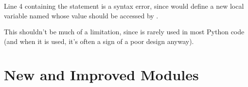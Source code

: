 \documentclass{howto}
\begin{document}
Line 4 containing the  statement is a syntax error,
since  would define a new local variable named 
whose value should be accessed by .  

This shouldn't be much of a limitation, since  is rarely
used in most Python code (and when it is used, it's often a sign of a
poor design anyway).

\begin{seealso}


\end{seealso}


\section{New and Improved Modules}
\end{document}
